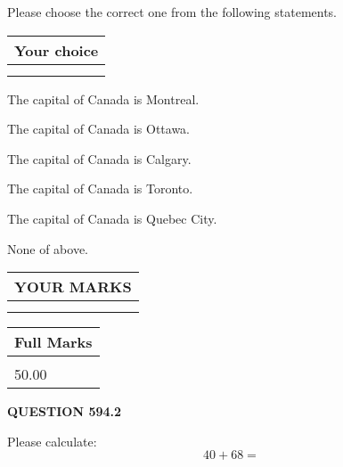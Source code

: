 \documentclass[12pt]{article}
\begin{document}
  
Please choose the correct one from the following statements.
  
  
\noindent\hspace{3.0in} \begin{tabular}{|l|}
\hline
Your choice \\
\hline
 \\ 
 \\ 
\hline
\end{tabular}
  
  
 
 
The capital of Canada is Montreal.
 
 
The capital of Canada is Ottawa.
 
 
The capital of Canada is Calgary.
 
 
The capital of Canada is Toronto.
 
 
The capital of Canada is Quebec City.
 
 
 None of above.
 
 
  
\vspace{0.2in}
  
\noindent\begin{tabular}{|l|}
\hline
 YOUR MARKS  \\
\hline
 \\ 
 \\ 
\hline
\end{tabular}
\hspace{0.05in} \begin{tabular}{|l|}
\hline
 Full Marks  \\
\hline
 \\ 
50.00 \\
\hline
\end{tabular}
{\textbf{\Large{QUESTION
594.2 
}}}
  
  
 
Please calculate:
\begin{equation}
40 +  %
68 = \nonumber
\end{equation}
 

 

 
   
   
 \vspace{0.2in}
 
   
   
   
   
\end{document}
